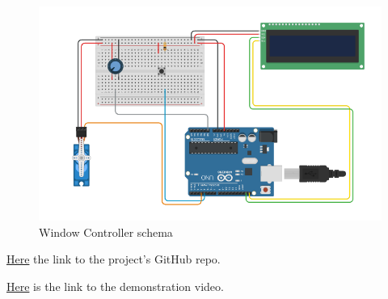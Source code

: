 \documentclass[a4paper,12pt]{report}
\begin{document}
    \begin{figure}[H]
        \centering{}
            \includegraphics[width=\textwidth]{report/img/Assignment-03_SMT-Window-Subsystem.png}
        \caption{Window Controller schema}
        \label{img:window_schema}
    \end{figure}

    \centerline{\href{https://github.com/Cinels/IoT-assignment-03}{Here} the link to the project's GitHub repo.}
    \centerline{\href{https://drive.google.com/file/d/1_jwWhG-SpaD6GN4JjTTVoiYj28xYpo44/view?usp=sharing}{Here} 
    is the link to the demonstration video.}
    
\end{document}
